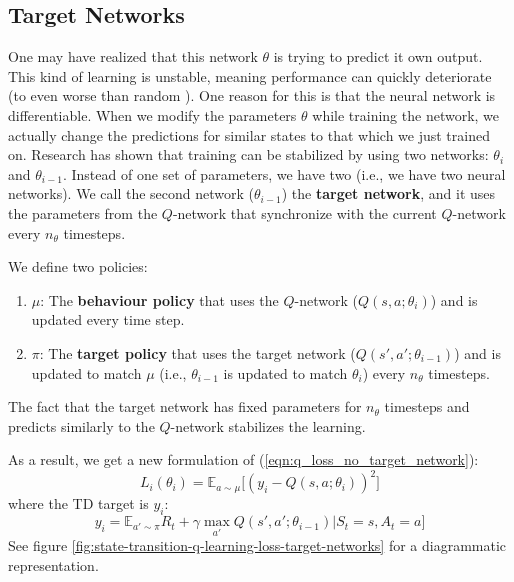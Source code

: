 \documentclass[journal, onecolumn, 12pt, draftclsnofoot]{IEEEtran}
\numberwithin{equation}{section}
\newcommand{\kword}[1]{\textbf{#1}}
\begin{document}
		\subsection{Target Networks}
		\par One may have realized that this network $\theta$ is trying to predict it own output. This kind of learning is unstable, meaning performance can quickly deteriorate (to even worse than random \cite{worse_than_random}). One reason for this is that the neural network is differentiable. When we modify the parameters $\theta$ while training the network, we actually change the predictions for similar states to that which we just trained on. Research has shown that training can be stabilized by using two networks: $\theta_i$ and $\theta_{i-1}$. Instead of one set of parameters, we have two (i.e., we have two neural networks). We call the second network ($\theta_{i-1}$) the \kword{target network}, and it uses the parameters from the $Q$-network that synchronize with the current $Q$-network every $n_\theta$ timesteps.
		\par We define two policies:
		\begin{enumerate}
			\item $\mu$: The \kword{behaviour policy} that uses the $Q$-network ($Q(s,a;\theta_i)$) and is updated every time step.
			\item $\pi$: The \kword{target policy} that uses the target network ($Q(s',a';\theta_{i-1})$) and is updated to match $\mu$ (i.e., $\theta_{i-1}$ is updated to match $\theta_i$) every $n_\theta$ timesteps.
		\end{enumerate}
		The fact that the target network has fixed parameters for $n_\theta$ timesteps and predicts similarly to the $Q$-network stabilizes the learning.
		\par As a result, we get a new formulation of (\ref{eqn:q_loss_no_target_network}):
		\begin{equation}
				\label{eqn:q_loss_target_network}
				L_i(\theta_i) = \mathbb{E}_{a \sim \mu} \big[ (y_i - Q(s,a;\theta_i))^2 \big]
		\end{equation}
		where the TD target is $y_i$:
		\begin{equation}
			\label{eqn:y_i_target_network}
			y_i = \mathbb{E}_{a' \sim \pi} R_t + \gamma \max_{a'}Q(s', a'; \theta_{i-1}) \vert S_t = s, A_t = a]
		\end{equation}
		See figure \ref{fig:state-transition-q-learning-loss-target-networks} for a diagrammatic representation.
\end{document}
